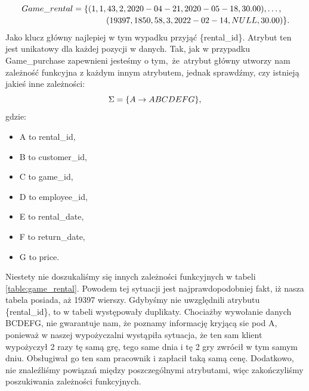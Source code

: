 \documentclass{article}
\theoremstyle{break}
\begin{document}
	$$
	\begin{multlined}
	Game\_rental=\{(1, 1, 43, 2,2020-04-21,2020-05-18,30.00), \dots,\\
	 (19397, 1850, 58, 3, 2022\--02\--14,NULL, 30.00)\}. 	
	\end{multlined}
	$$  
	Jako klucz główny najlepiej w tym wypadku przyjąć \{rental\_id\}. Atrybut ten jest unikatowy dla każdej pozycji w danych. Tak, jak w przypadku Game\_purchase zapewnieni jesteśmy o tym,~że~atrybut główny utworzy nam zależność funkcyjna z każdym innym atrybutem, jednak sprawdźmy, czy istnieją jakieś inne zależności: 
	$$ \Sigma = \{A \rightarrow ABCDEFG \}, \\ $$
	gdzie:
	\begin{itemize}
		\item A to rental\_id,
		\item B to customer\_id,
		\item C to game\_id,
		\item D to employee\_id,
		\item E to rental\_date,
		\item F to return\_date,
		\item G to price.
	\end{itemize}
	Niestety nie doszukaliśmy się innych zależności funkcyjnych w tabeli \ref{table:game_rental}. Powodem tej sytuacji jest najprawdopodobniej fakt, iż nasza tabela posiada, aż 19397 wierszy. Gdybyśmy nie uwzględnili atrybutu \{rental\_id\}, to w tabeli występowały duplikaty. Chociażby wywołanie danych BCDEFG, nie gwarantuje nam, że poznamy informację kryjącą sie pod A, ponieważ w naszej wypożyczalni wystąpiła sytuacja, że ten sam klient wypożyczył 2 razy tę samą grę, tego same dnia i tę 2 gry zwrócił w tym samym dniu. Obsługiwał go ten sam pracownik i zapłacił taką samą cenę. Dodatkowo, nie znaleźliśmy powiązań między poszczególnymi atrybutami, więc zakończyliśmy poszukiwania zależności funkcyjnych.
\end{document}
